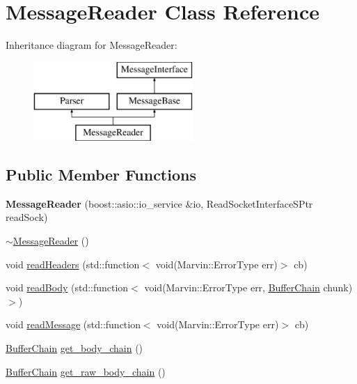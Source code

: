 \hypertarget{class_message_reader}{}\section{Message\+Reader Class Reference}
\label{class_message_reader}
Inheritance diagram for Message\+Reader\+:\begin{figure}[H]
\begin{center}
\leavevmode
\includegraphics[height=3.000000cm]{class_message_reader}
\end{center}
\end{figure}
\subsection*{Public Member Functions}
\begin{DoxyCompactItemize}
\item 
\mbox{\label{class_message_reader_a782500be6ba3210d3afc1cec4c68bd62}} 
{\bfseries Message\+Reader} (boost\+::asio\+::io\+\_\+service \&io, Read\+Socket\+Interface\+S\+Ptr read\+Sock)
\item 
\hyperlink{class_message_reader_ab5a1832a8447dd11d8d57d8aed44d3a9}{$\sim$\+Message\+Reader} ()
\item 
void \hyperlink{class_message_reader_ab63fcdf1b67d82ce259d1e82775149a5}{read\+Headers} (std\+::function$<$ void(Marvin\+::\+Error\+Type err)$>$ cb)
\item 
void \hyperlink{class_message_reader_a811c0c6620e4bc7af99d5f519552846f}{read\+Body} (std\+::function$<$ void(Marvin\+::\+Error\+Type err, \hyperlink{class_buffer_chain}{Buffer\+Chain} chunk)$>$)
\item 
void \hyperlink{class_message_reader_a16e0cec435a29862c95cdccf61b3099b}{read\+Message} (std\+::function$<$ void(Marvin\+::\+Error\+Type err)$>$ cb)
\item 
\hyperlink{class_buffer_chain}{Buffer\+Chain} \hyperlink{class_message_reader_ac480fcf3e6f5b1bb89b467d372a4e435}{get\+\_\+body\+\_\+chain} ()
\item 
\hyperlink{class_buffer_chain}{Buffer\+Chain} \hyperlink{class_message_reader_a93a38a06b77aea962b76fab6f9ba77e2}{get\+\_\+raw\+\_\+body\+\_\+chain} ()
\end{DoxyCompactItemize}
